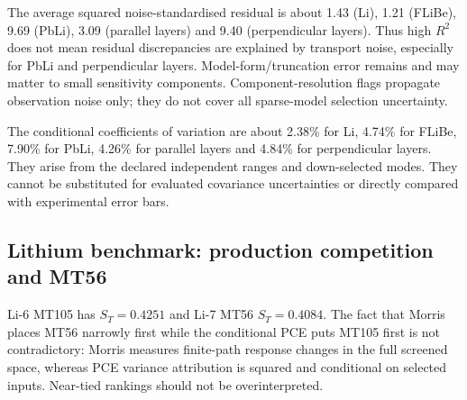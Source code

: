The average squared noise-standardised residual is about 1.43 (Li), 1.21 (FLiBe), 9.69 (PbLi), 3.09 (parallel layers) and 9.40 (perpendicular layers). Thus high $R^2$ does not mean residual discrepancies are explained by transport noise, especially for PbLi and perpendicular layers. Model-form/truncation error remains and may matter to small sensitivity components. Component-resolution flags propagate observation noise only; they do not cover all sparse-model selection uncertainty.


\begin{table}[tbp]\centering\scriptsize
\caption{Baseline and conditional PCE response distributions, in verified tritons/source neutron. Baseline errors are one batch standard error; PCE spread is input-induced variation, not a standard error. The 5--95\% range is not an evaluated nuclear-data confidence interval.}
\resizebox{\linewidth}{!}{}\label{tab:distribution}
\end{table}

The conditional coefficients of variation are about 2.38\% for Li, 4.74\% for FLiBe, 7.90\% for PbLi, 4.26\% for parallel layers and 4.84\% for perpendicular layers. They arise from the declared independent ranges and down-selected modes. They cannot be substituted for evaluated covariance uncertainties or directly compared with experimental error bars.

\subsection{Lithium benchmark: production competition and MT56}
\begin{table}[tbp]\centering\caption{Leading conditional Sobol indices: Li sphere. Full selected-input table in Appendix~\ref{app:indices}.}\end{table}
Li-6 MT105 has $S_T=0.4251$ and Li-7 MT56 $S_T=0.4084$. The fact that Morris places MT56 narrowly first while the conditional PCE puts MT105 first is not contradictory: Morris measures finite-path response changes in the full screened space, whereas PCE variance attribution is squared and conditional on selected inputs. Near-tied rankings should not be overinterpreted.

